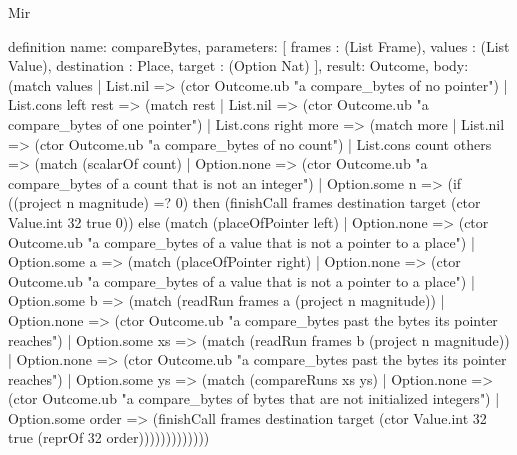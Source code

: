 \begin{lexlean}{Mir}
\begin{semanticmodule}
definition{
  name: compareBytes,
  parameters: [
    frames : (List Frame),
    values : (List Value),
    destination : Place,
    target : (Option Nat)
  ],
  result: Outcome,
  body: (match values
    | List.nil => (ctor Outcome.ub "a compare_bytes of no pointer")
    | List.cons left rest => (match rest
      | List.nil => (ctor Outcome.ub "a compare_bytes of one pointer")
      | List.cons right more => (match more
        | List.nil => (ctor Outcome.ub "a compare_bytes of no count")
        | List.cons count others => (match (scalarOf count)
          | Option.none => (ctor Outcome.ub "a compare_bytes of a count that is not an integer")
          | Option.some n => (if ((project n magnitude) =? 0) then (finishCall frames destination target (ctor Value.int 32 true 0)) else (match (placeOfPointer left)
            | Option.none => (ctor Outcome.ub "a compare_bytes of a value that is not a pointer to a place")
            | Option.some a => (match (placeOfPointer right)
              | Option.none => (ctor Outcome.ub "a compare_bytes of a value that is not a pointer to a place")
              | Option.some b => (match (readRun frames a (project n magnitude))
                | Option.none => (ctor Outcome.ub "a compare_bytes past the bytes its pointer reaches")
                | Option.some xs => (match (readRun frames b (project n magnitude))
                  | Option.none => (ctor Outcome.ub "a compare_bytes past the bytes its pointer reaches")
                  | Option.some ys => (match (compareRuns xs ys)
                    | Option.none => (ctor Outcome.ub "a compare_bytes of bytes that are not initialized integers")
                    | Option.some order => (finishCall frames destination target (ctor Value.int 32 true (reprOf 32 order)))))))))))))
}


\end{semanticmodule}
\end{lexlean}
